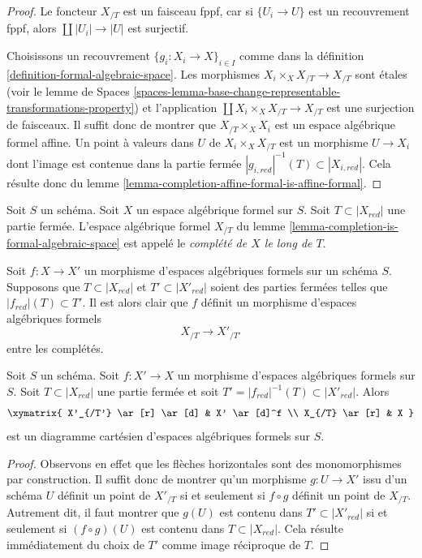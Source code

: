 \begin{proof}
Le foncteur $X_{/T}$ est un faisceau fppf, car si
$\{U_i \to U\}$ est un recouvrement fppf, alors
$\coprod |U_i| \to |U|$ est surjectif.

\medskip\noindent
Choisissons un recouvrement $\{g_i : X_i \to X\}_{i \in I}$ comme dans la définition
\ref{definition-formal-algebraic-space}.
Les morphismes $X_i \times_X X_{/T} \to X_{/T}$ sont \'etales
(voir le lemme de Spaces
\ref{spaces-lemma-base-change-representable-transformations-property})
et l'application $\coprod X_i \times_X X_{/T} \to X_{/T}$ est une surjection de
faisceaux. Il suffit donc de montrer que $X_{/T} \times_X X_i$
est un espace algébrique formel affine. Un point à valeurs dans $U$ de
$X_i \times_X X_{/T}$ est un morphisme $U \to X_i$ dont l'image est
contenue dans la partie fermée
$|g_{i, red}|^{-1}(T) \subset |X_{i, red}|$. Cela résulte donc du
lemme \ref{lemma-completion-affine-formal-is-affine-formal}.
\end{proof}

\begin{definition}
\label{definition-completion-formal-algebraic-space}
Soit $S$ un schéma. Soit $X$ un espace algébrique formel sur $S$.
Soit $T \subset |X_{red}|$ une partie fermée. L'espace algébrique formel
$X_{/T}$ du lemme \ref{lemma-completion-is-formal-algebraic-space}
est appelé le {\it complété de $X$ le long de $T$}.
\end{definition}

\noindent
Soit $f : X \to X'$ un morphisme d'espaces algébriques formels sur un schéma $S$.
Supposons que $T \subset |X_{red}|$ et $T' \subset |X'_{red}|$
soient des parties fermées telles que $|f_{red}|(T) \subset T'$. Il est alors clair que
$f$ définit un morphisme d'espaces algébriques formels
$$
X_{/T} \longrightarrow X'_{/T'}
$$
entre les complétés.

\begin{lemma}
\label{lemma-map-recompletions}
Soit $S$ un schéma. Soit $f : X' \to X$ un morphisme
d'espaces algébriques formels sur $S$. Soit $T \subset |X_{red}|$
une partie fermée et soit $T' = |f_{red}|^{-1}(T) \subset |X'_{red}|$.
Alors
$$
\xymatrix{
X'_{/T'} \ar[r] \ar[d] & X' \ar[d]^f \\
X_{/T} \ar[r] & X
}
$$
est un diagramme cartésien d'espaces algébriques formels sur $S$.
\end{lemma}

\begin{proof}
Observons en effet que les flèches horizontales sont des monomorphismes
par construction. Il suffit donc de montrer qu'un morphisme
$g : U \to X'$ issu d'un schéma $U$ définit un point de $X'_{/T}$
si et seulement si $f \circ g$ définit un point de $X_{/T}$.
Autrement dit, il faut montrer que
$g(U)$ est contenu dans $T' \subset |X'_{red}|$
si et seulement si $(f \circ g)(U)$ est contenu dans $T \subset |X_{red}|$.
Cela résulte immédiatement du choix de $T'$ comme
image réciproque de $T$.
\end{proof}


